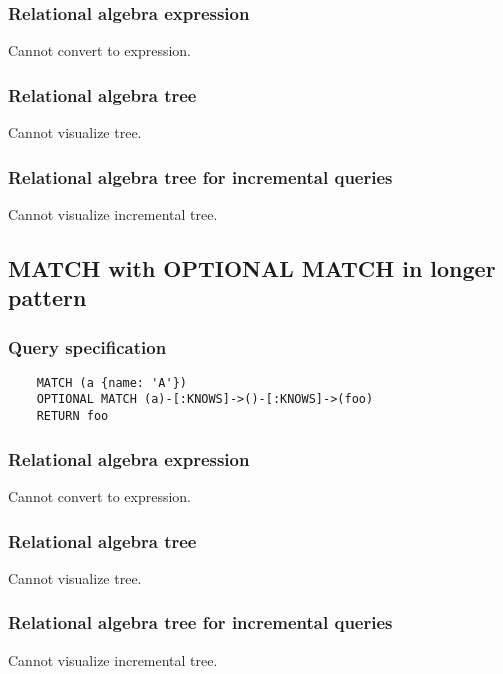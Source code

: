 	\subsubsection*{Relational algebra expression}

	Cannot convert to expression.

	\subsubsection*{Relational algebra tree}

	Cannot visualize tree.

	\subsubsection*{Relational algebra tree for incremental queries}

	Cannot visualize incremental tree.
	\subsection{MATCH with OPTIONAL MATCH in longer pattern}

	\subsubsection*{Query specification}

	\begin{lstlisting}
	MATCH (a {name: 'A'})
	OPTIONAL MATCH (a)-[:KNOWS]->()-[:KNOWS]->(foo)
	RETURN foo
	\end{lstlisting}


	\subsubsection*{Relational algebra expression}

	Cannot convert to expression.

	\subsubsection*{Relational algebra tree}

	Cannot visualize tree.

	\subsubsection*{Relational algebra tree for incremental queries}

	Cannot visualize incremental tree.
